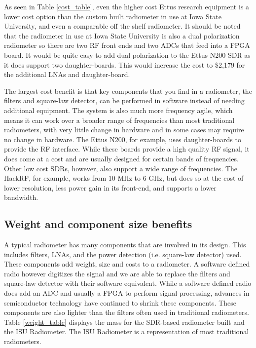 As seen in Table \ref{cost_table}, even the higher cost Ettus research equipment is a lower cost option than the custom built radiometer in use at Iowa State University, and even a comparable off the shelf radiometer.  It should be noted that the radiometer in use at Iowa State University is also a dual polarization radiometer so there are two RF front ends and two ADCs that feed into a FPGA board.  It would be quite easy to add dual polarization to the Ettus N200 SDR as it does support two daughter-boards.  This would increase the cost to \$2,179 for the additional LNAs and daughter-board.

The largest cost benefit is that key components that you find in a radiometer, the filters and square-law detector, can be performed in software instead of needing additional equipment.  The system is also much more frequency agile, which means it can work over a broader range of frequencies than most traditional radiometers, with very little change in hardware and in some cases may require no change in hardware.  The Ettus N200, for example, uses daughter-boards to provide the RF interface.  While these boards provide a high quality RF signal, it does come at a cost and are usually designed for certain bands of frequencies.  Other low cost SDRs, however, also support a wide range of frequencies.  The HackRF, for example, works from 10 MHz to 6 GHz, but does so at the cost of lower resolution, less power gain in its front-end, and supports a lower bandwidth.

\subsection{Weight and component size benefits}

A typical radiometer has many components that are involved in its design.  This includes filters, LNAs, and the power detection (i.e. square-law detector) used.  These components add weight, size and costs to a radiometer.  A software defined radio however digitizes the signal and we are able to replace the filters and square-law detector with their software equivalent.  While a software defined radio does add an ADC and usually a FPGA to perform signal processing, advances in semiconductor technology have continued to shrink these components.  These components are also lighter than the filters often used in traditional radiometers.  Table \ref{weight_table} displays the mass for the SDR-based radiometer built and the ISU Radiometer.  The ISU Radiometer is a representation of most traditional radiometers.

